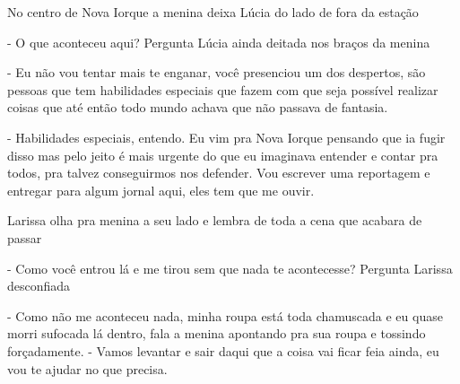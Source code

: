 No centro de Nova Iorque a menina deixa Lúcia do lado de fora da estação

- O que aconteceu aqui? Pergunta Lúcia ainda deitada nos braços da menina

- Eu não vou tentar mais te enganar, você presenciou um dos despertos, são pessoas que tem habilidades especiais que fazem com que seja possível realizar coisas que até então todo mundo achava que não passava de fantasia.

- Habilidades especiais, entendo. Eu vim pra Nova Iorque pensando que ia fugir disso mas pelo jeito é mais urgente do que eu imaginava entender e contar pra todos, pra talvez conseguirmos nos defender. Vou escrever uma reportagem e entregar para algum jornal aqui, eles tem que me ouvir.

Larissa olha pra menina a seu lado e lembra de toda a cena que acabara de passar

- Como você entrou lá e me tirou sem que nada te acontecesse? Pergunta Larissa desconfiada

- Como não me aconteceu nada, minha roupa está toda chamuscada e eu quase morri sufocada lá dentro, fala a menina apontando pra sua roupa e tossindo forçadamente. - Vamos levantar e sair daqui que a coisa vai ficar feia ainda, eu vou te ajudar no que precisa.
